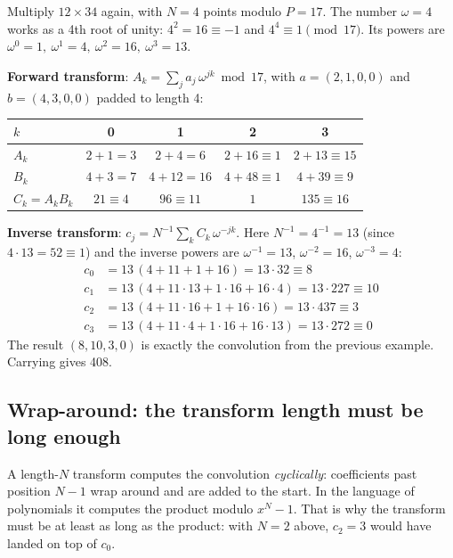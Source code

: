 \begin{example}
Multiply $12 \times 34$ again, with $N = 4$ points modulo $P = 17$. The number
$\omega = 4$ works as a 4th root of unity: $4^2 = 16 \equiv -1$ and $4^4 \equiv 1 \pmod{17}$.
Its powers are $\omega^0 = 1,\ \omega^1 = 4,\ \omega^2 = 16,\ \omega^3 = 13$.

\textbf{Forward transform}: $A_k = \sum_j a_j\, \omega^{jk} \bmod 17$, with $a = (2,1,0,0)$
and $b = (4,3,0,0)$ padded to length 4:
\begin{center}
\begin{tabular}{lcccc}
\toprule
$k$ & 0 & 1 & 2 & 3 \\
\midrule
$A_k$ & $2+1 = 3$ & $2+4 = 6$ & $2+16 \equiv 1$ & $2+13 \equiv 15$ \\
$B_k$ & $4+3 = 7$ & $4+12 = 16$ & $4+48 \equiv 1$ & $4+39 \equiv 9$ \\
$C_k = A_k B_k$ & $21 \equiv 4$ & $96 \equiv 11$ & $1$ & $135 \equiv 16$ \\
\bottomrule
\end{tabular}
\end{center}

\textbf{Inverse transform}: $c_j = N^{-1} \sum_k C_k\, \omega^{-jk}$. Here $N^{-1} = 4^{-1} = 13$
(since $4 \cdot 13 = 52 \equiv 1$) and the inverse powers are $\omega^{-1} = 13$,
$\omega^{-2} = 16$, $\omega^{-3} = 4$:
\begin{align*}
c_0 &= 13\,(4 + 11 + 1 + 16) = 13 \cdot 32 \equiv 8\\
c_1 &= 13\,(4 + 11\cdot 13 + 1 \cdot 16 + 16 \cdot 4) = 13 \cdot 227 \equiv 10\\
c_2 &= 13\,(4 + 11 \cdot 16 + 1 + 16 \cdot 16) = 13 \cdot 437 \equiv 3\\
c_3 &= 13\,(4 + 11 \cdot 4 + 1 \cdot 16 + 16 \cdot 13) = 13 \cdot 272 \equiv 0
\end{align*}
The result $(8, 10, 3, 0)$ is exactly the convolution from the previous example. Carrying
gives 408.
\end{example}

\subsection{Wrap-around: the transform length must be long enough}

A length-$N$ transform computes the convolution \emph{cyclically}: coefficients past
position $N-1$ wrap around and are added to the start. In the language of polynomials it
computes the product modulo $x^N - 1$. That is why the transform must be at least as long
as the product: with $N = 2$ above, $c_2 = 3$ would have landed on top of $c_0$.


